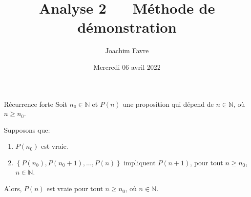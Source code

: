 \documentclass[a4paper]{article}
\title{Analyse 2 --- Méthode de démonstration}
\author{Joachim Favre}
\date{Mercredi 06 avril 2022}
\begin{document}
\maketitle


\begin{parag}{Récurrence forte}
    Soit $n_0 \in \mathbb{N}$ et $P\left(n\right)$ une proposition qui dépend de $n \in \mathbb{N}$, où $n \geq n_0$.

    Supposons que:
    \begin{enumerate}
        \item $P\left(n_0\right)$ est vraie.
        \item $\left\{P\left(n_0\right), P\left(n_0 + 1\right), \ldots, P\left(n\right)\right\}$ impliquent $P\left(n+1\right)$, pour tout $n \geq n_0$, $n \in \mathbb{N}$.
    \end{enumerate}
    
    Alors, $P\left(n\right)$ est vraie pour tout $n \geq n_0$, où $n \in \mathbb{N}$.
\end{parag}
\end{document}
